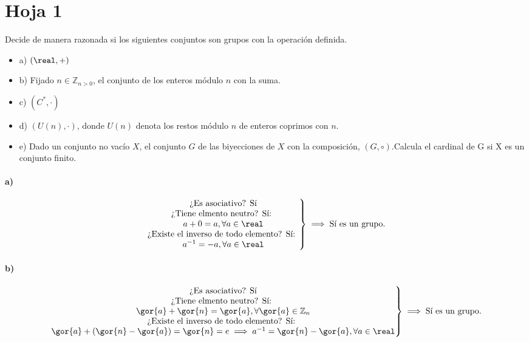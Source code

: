 \documentclass{apuntes}
\begin{document}
\section{Hoja 1}
\begin{problem}[1]
 Decide de manera razonada si los siguientes conjuntos son grupos con la operación definida.
 
 \begin{itemize}
  \item a) $(\real,+)$
  \item b) Fijado $n \in \mathbb{Z}_{n>0}$, el conjunto de los enteros módulo $n$ con la suma.
  \item c) $(C^*,\cdot)$
  \item d) $(U (n), ·)$, donde $U (n)$ denota los restos módulo $n$ de enteros coprimos con $n$.
  \item e) Dado un conjunto no vacío $X$, el conjunto $G$ de las biyecciones de $X$ con la composición, $(G, \circ)$.Calcula el cardinal de G si X es un conjunto finito.
 \end{itemize}

 \solution

\paragraph{a)}
$$\left. \begin{matrix}
\text{¿Es asociativo? Sí}\\
\text{¿Tiene elmento neutro? Sí: } \\a + 0 = a, \forall a \in \real\\
\text{¿Existe el inverso de todo elemento? Sí: } \\a^{-1} = -a, \forall a \in \real
\end{matrix}\right\} \implies \text{Sí es un grupo.}$$

\paragraph{b)}
$$\left. \begin{matrix}
\text{¿Es asociativo? Sí}\\
\text{¿Tiene elmento neutro? Sí: } \\\gor{a} + \gor{n} = \gor{a}, \forall \gor{a} \in \mathbb{Z}_n\\
\text{¿Existe el inverso de todo elemento? Sí: } \\ \gor{a} + (\gor{n} - \gor{a}) = \gor{n} = e \implies a^{-1} = \gor{n} - \gor{a}, \forall a \in \real
\end{matrix}\right\} \implies \text{Sí es un grupo.}$$

\end{problem}
\end{document}

